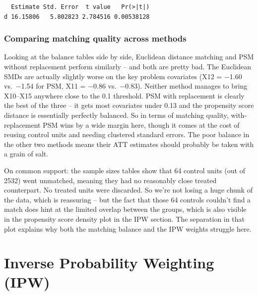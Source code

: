 \documentclass[
  letterpaper,
  DIV=11,
  numbers=noendperiod]{scrartcl}
\begin{document}
\begin{verbatim}
  Estimate Std. Error  t value   Pr(>|t|)
d 16.15806   5.802823 2.784516 0.00538128
\end{verbatim}

\subsubsection{Comparing matching quality across
methods}\label{comparing-matching-quality-across-methods}

Looking at the balance tables side by side, Euclidean distance matching
and PSM without replacement perform similarly -- and both are pretty
bad. The Euclidean SMDs are actually slightly worse on the key problem
covariates (X12 = −1.60 vs.~−1.54 for PSM, X11 = −0.86 vs.~−0.83).
Neither method manages to bring X10--X15 anywhere close to the 0.1
threshold. PSM with replacement is clearly the best of the three -- it
gets most covariates under 0.13 and the propensity score distance is
essentially perfectly balanced. So in terms of matching quality,
with-replacement PSM wins by a wide margin here, though it comes at the
cost of reusing control units and needing clustered standard errors. The
poor balance in the other two methods means their ATT estimates should
probably be taken with a grain of salt.

On common support: the sample sizes tables show that 64 control units
(out of 2532) went unmatched, meaning they had no reasonably close
treated counterpart. No treated units were discarded. So we're not
losing a huge chunk of the data, which is reassuring -- but the fact
that those 64 controls couldn't find a match does hint at the limited
overlap between the groups, which is also visible in the propensity
score density plot in the IPW section. The separation in that plot
explains why both the matching balance and the IPW weights struggle
here.

\section{Inverse Probability Weighting
(IPW)}\label{inverse-probability-weighting-ipw}
\end{document}
